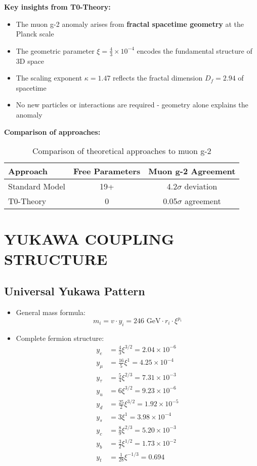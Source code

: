 \documentclass[12pt,a4paper]{article}
\begin{document}
\textbf{Key insights from T0-Theory:}
\begin{itemize}
	\item The muon g-2 anomaly arises from \textbf{fractal spacetime geometry} at the Planck scale
	\item The geometric parameter $\xi = \frac{4}{3} \times 10^{-4}$ encodes the fundamental structure of 3D space
	\item The scaling exponent $\kappa = 1.47$ reflects the fractal dimension $D_f = 2.94$ of spacetime
	\item No new particles or interactions are required - geometry alone explains the anomaly
\end{itemize}

\textbf{Comparison of approaches:}
\begin{table}[h]
	\centering
	\begin{tabular}{lcc}
		\toprule
		\textbf{Approach} & \textbf{Free Parameters} & \textbf{Muon g-2 Agreement} \\
		\midrule
		Standard Model & 19+ & 4.2$\sigma$ deviation \\
		T0-Theory & 0 & 0.05$\sigma$ agreement \\
		\bottomrule
	\end{tabular}
	\caption{Comparison of theoretical approaches to muon g-2}
\end{table}
\section{YUKAWA COUPLING STRUCTURE}

\subsection{Universal Yukawa Pattern}
\begin{itemize}
	\item General mass formula:
	$$m_i = v \cdot y_i = 246 \text{ GeV} \cdot r_i \cdot \xi^{p_i}$$
	
	\item Complete fermion structure:
	\begin{align*}
		y_e &= \frac{4}{3}\xi^{3/2} = 2.04 \times 10^{-6}\\
		y_\mu &= \frac{16}{5}\xi^1 = 4.25 \times 10^{-4}\\
		y_\tau &= \frac{5}{4}\xi^{2/3} = 7.31 \times 10^{-3}\\
		y_u &= 6\xi^{3/2} = 9.23 \times 10^{-6}\\
		y_d &= \frac{25}{2}\xi^{3/2} = 1.92 \times 10^{-5}\\
		y_s &= 3\xi^1 = 3.98 \times 10^{-4}\\
		y_c &= \frac{8}{9}\xi^{2/3} = 5.20 \times 10^{-3}\\
		y_b &= \frac{3}{2}\xi^{1/2} = 1.73 \times 10^{-2}\\
		y_t &= \frac{1}{28}\xi^{-1/3} = 0.694
	\end{align*}
\end{itemize}
\end{document}
